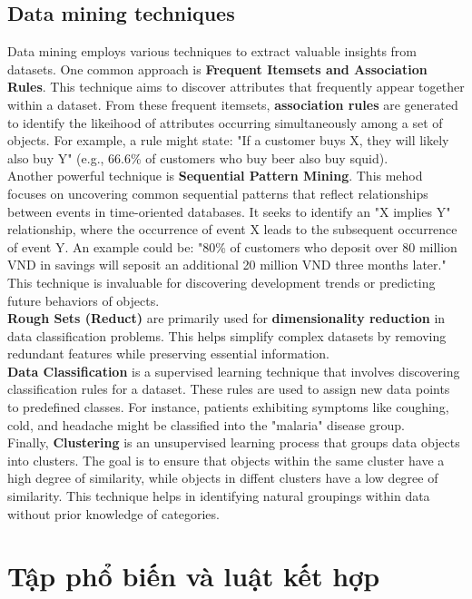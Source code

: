 \section{Data mining techniques}
Data mining employs various techniques to extract valuable insights from datasets. One common approach is \textbf{Frequent Itemsets and Association Rules}. This technique aims to discover attributes that frequently appear together within a dataset. From these frequent itemsets, \textbf{association rules} are generated to identify the likeihood of attributes occurring simultaneously among a set of objects. For example, a rule might state: "If a customer buys X, they will likely also buy Y" (e.g., 66.6\% of customers who buy beer also buy squid).\\
Another powerful technique is \textbf{Sequential Pattern Mining}. This mehod focuses on uncovering common sequential patterns that reflect relationships between events in time-oriented databases. It seeks to identify an "X implies Y" relationship, where the occurrence of event X leads to the subsequent occurrence of event Y. An example could be: "80\% of customers who deposit over 80 million VND in savings will seposit an additional 20 million VND three months later." This technique is invaluable for discovering development trends or predicting future behaviors of objects.\\
\textbf{Rough Sets (Reduct)} are primarily used for \textbf{dimensionality reduction} in data classification problems. This helps simplify complex datasets by removing redundant features while preserving essential information.\\
\textbf{Data Classification} is a supervised learning technique that involves discovering classification rules for a dataset. These rules are used to assign new data points to predefined classes. For instance, patients exhibiting symptoms like coughing, cold, and headache might be classified into the "malaria" disease group.\\
Finally, \textbf{Clustering} is an unsupervised learning process that groups data objects into clusters. The goal is to ensure that objects within the same cluster have a high degree of similarity, while objects in diffent clusters have a low degree of similarity. This technique helps in identifying natural groupings within data without prior knowledge of categories.
\chapter{Tập phổ biến và luật kết hợp}


